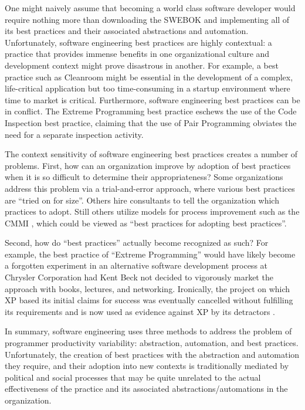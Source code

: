 One might naively assume that becoming a world class software developer
would require nothing more than downloading the SWEBOK and implementing all
of its best practices and their associated abstractions and automation.
Unfortunately, software engineering best practices are highly contextual: a
practice that provides immense benefits in one organizational culture and
development context might prove disastrous in another. For example, a best
practice such as Cleanroom might be essential in the development of a
complex, life-critical application but too time-consuming in a startup
environment where time to market is critical.  Furthermore, software
engineering best practices can be in conflict.  The Extreme Programming
\cite{Beck00} best practice eschews the use of the Code Inspection
\cite{Fagan76} best practice, claiming that the use of Pair Programming
obviates the need for a separate inspection activity.

The context sensitivity of software engineering best practices creates a
number of problems. First, how can an organization improve by adoption of
best practices when it is so difficult to determine their appropriateness?
Some organizations address this problem via a trial-and-error
approach, where various best practices are ``tried on for size''.  Others
hire consultants to tell the organization which practices to
adopt. Still others utilize models for process improvement such as
the CMMI \cite{Royce02}, which could be viewed as ``best practices for
adopting best practices''.

Second, how do ``best practices'' actually become recognized as such?  For
example, the best practice of ``Extreme Programming'' would have likely 
become a forgotten experiment in an alternative software development
process at Chrysler Corporation had Kent Beck not decided to vigorously
market the approach with books, lectures, and networking.  Ironically, the
project on which XP based its initial claims for success was eventually
cancelled without fulfilling its requirements and is now used as evidence
against XP by its detractors \cite{Keefer03}.

In summary, software engineering uses three methods to address the problem
of programmer productivity variability: abstraction, automation, and best
practices.  Unfortunately, the creation of best practices with the
abstraction and automation they require, and their adoption into new
contexts is traditionally mediated by political and social processes that
may be quite unrelated to the actual effectiveness of the practice and its
associated abstractions/automations in the organization.


